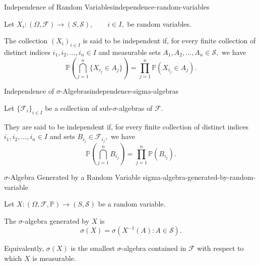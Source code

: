 \begin{definition}{Independence of Random Variables}{independence-random-variables}

Let
\(
    X_i:(\Omega,\mathcal{F})
    \longrightarrow
    (S,\mathcal{S}),
    \qquad i\in I,
\)
be random variables.

The collection $(X_i)_{i\in I}$ is said to be independent if, for every
finite collection of distinct indices
\(
    i_1,i_2,\ldots,i_n\in I
\)
and measurable sets
\(
    A_1,A_2,\ldots,A_n\in\mathcal{S},
\)
we have
\[
    \mathbb{P}
    \left(
        \bigcap_{j=1}^{n}
        \{X_{i_j}\in A_j\}
    \right)
    =
    \prod_{j=1}^{n}
    \mathbb{P}(X_{i_j}\in A_j).
\]

\end{definition}


\begin{definition}{Independence of $\sigma$-Algebras}{independence-sigma-algebras}

Let
\(
    \{\mathcal{F}_i\}_{i\in I}
\)
be a collection of sub-$\sigma$-algebras of $\mathcal{F}$.

They are said to be independent if, for every finite collection of
distinct indices
\(
    i_1,i_2,\ldots,i_n\in I
\)
and sets
\(
    B_{i_j}\in\mathcal{F}_{i_j},
\)
we have
\[
    \mathbb{P}
    \left(
        \bigcap_{j=1}^{n}B_{i_j}
    \right)
    =
    \prod_{j=1}^{n}
    \mathbb{P}(B_{i_j}).
\]

\end{definition}


\begin{definition}{$\sigma$-Algebra Generated by a Random Variable}
{sigma-algebra-generated-by-random-variable}

Let
\(
    X:(\Omega,\mathcal{F},\mathbb{P})
    \longrightarrow
    (S,\mathcal{S})
\)
be a random variable.

The $\sigma$-algebra generated by $X$ is
\[
    \sigma(X)
    =
    \sigma
    \left(
        X^{-1}(A):A\in\mathcal{S}
    \right).
\]

Equivalently, $\sigma(X)$ is the smallest $\sigma$-algebra contained
in $\mathcal{F}$ with respect to which $X$ is measurable.

\end{definition}

